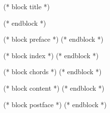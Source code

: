 \documentclass[((booktype)),
    (* for option in bookoptions *)((option)),
    (* endfor *)
    (* for instrument in instruments *)((instrument)),
    (* endfor *)
    ((mainfontsize))pt]{crepbook}
\begin{document}
(* block title *)
\maketitle
(* endblock *)

(* block preface *)
(* endblock *)

(* block index *)
(* endblock *)

(* block chords *)
(* endblock *)

(* block content *)
(* endblock *)

(* block postface *)
(* endblock *)
\end{document}
